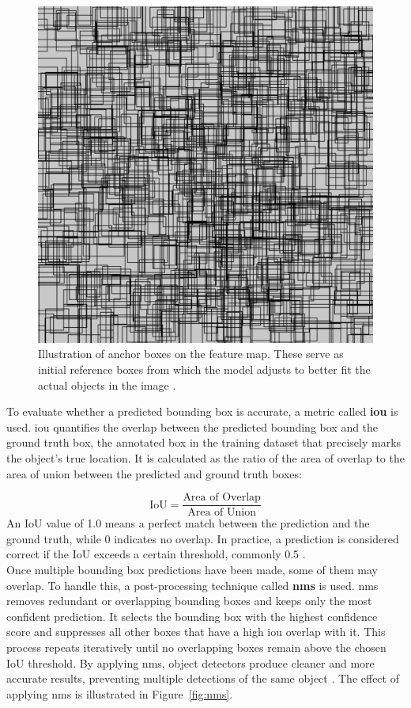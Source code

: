 \begin{figure}[h!]
    \centering
    \includegraphics[width=0.7\linewidth]{figures/theory/image-recognition/anchor-boxes.png}
    \caption[Anchor boxes in object detection]{Illustration of anchor boxes on the feature map. These serve as initial reference boxes from which the model adjusts to better fit the actual objects in the image \cite{thinkautonomous:anchorboxes}.}
    \label{fig:anchor-box}
\end{figure}

To evaluate whether a predicted bounding box is accurate, a metric called \textbf{\gls{iou}} is used. \gls{iou} quantifies the overlap between the predicted bounding box and the ground truth box, the annotated box in the training dataset that precisely marks the object's true location. It is calculated as the ratio of the area of overlap to the area of union between the predicted and ground truth boxes:

\[
\text{IoU} = \frac{\text{Area of Overlap}}{\text{Area of Union}}
\]
An IoU value of 1.0 means a perfect match between the prediction and the ground truth, while 0 indicates no overlap. In practice, a prediction is considered correct if the IoU exceeds a certain threshold, commonly 0.5 \cite{ultralytics:iou}. \\

 Once multiple bounding box predictions have been made, some of them may overlap. To handle this, a post-processing technique called \textbf{\gls{nms}} is used. \gls{nms} removes redundant or overlapping bounding boxes and keeps only the most confident prediction. It selects the bounding box with the highest confidence score and suppresses all other boxes that have a high \gls{iou} overlap with it. This process repeats iteratively until no overlapping boxes remain above the chosen IoU threshold. By applying \gls{nms}, object detectors produce cleaner and more accurate results, preventing multiple detections of the same object
\cite{thepythoncode:nms}. The effect of applying \gls{nms} is illustrated in Figure~\ref{fig:nms}.


